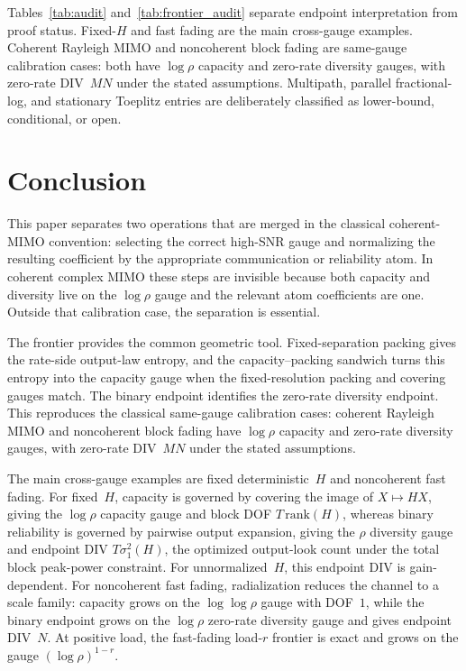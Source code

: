 \documentclass[lettersize,onecolumn]{IEEEtran}
\newcommand{\snr}{\rho}
\begin{document}
Tables~\ref{tab:audit} and~\ref{tab:frontier_audit} separate endpoint
interpretation from proof status. Fixed-$H$ and fast fading are the
main cross-gauge examples. Coherent Rayleigh MIMO and noncoherent
block fading are same-gauge calibration cases: both have $\log\snr$
capacity and zero-rate diversity gauges, with zero-rate DIV~$MN$
under the stated assumptions. Multipath, parallel fractional-log, and
stationary Toeplitz entries are deliberately classified as
lower-bound, conditional, or open.


\section{Conclusion}\label{sec:conclusion}

This paper separates two operations that are merged in the classical
coherent-MIMO convention: selecting the correct high-SNR gauge and
normalizing the resulting coefficient by the appropriate communication
or reliability atom. In coherent complex MIMO these steps are
invisible because both capacity and diversity live on the $\log\snr$
gauge and the relevant atom coefficients are one. Outside that
calibration case, the separation is essential.

The frontier provides the common geometric tool. Fixed-separation
packing gives the rate-side output-law entropy, and the
capacity--packing sandwich turns this entropy into the capacity gauge
when the fixed-resolution packing and covering gauges match. The
binary endpoint identifies the zero-rate diversity endpoint. This
reproduces the classical same-gauge calibration cases: coherent
Rayleigh MIMO and noncoherent block fading have $\log\snr$ capacity
and zero-rate diversity gauges, with zero-rate DIV~$MN$ under the
stated assumptions.

The main cross-gauge examples are fixed deterministic~$H$ and
noncoherent fast fading. For fixed~$H$, capacity is governed by
covering the image of $X \mapsto HX$, giving the $\log\snr$ capacity
gauge and block DOF $T\,\mathrm{rank}(H)$, whereas binary reliability is governed by pairwise output expansion,
giving the $\snr$ diversity gauge and endpoint DIV $T\sigma_1^2(H)$,
the optimized output-look count under the total block peak-power
constraint. For unnormalized~$H$, this endpoint DIV is
gain-dependent. For noncoherent fast fading,
radialization reduces the channel to a scale family: capacity grows on
the $\log\log\snr$ gauge with DOF~$1$, while the binary endpoint
grows on the $\log\snr$ zero-rate diversity gauge and gives endpoint DIV~$N$. At
positive load, the fast-fading load-$r$ frontier is exact and grows
on the gauge $(\log\snr)^{1-r}$.
\end{document}
